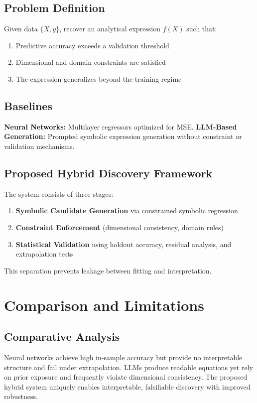 \documentclass[11pt]{article}
\begin{document}
\subsection{Problem Definition}
Given data $\{X, y\}$, recover an analytical expression $f(X)$ such that:
\begin{enumerate}
\item Predictive accuracy exceeds a validation threshold
\item Dimensional and domain constraints are satisfied
\item The expression generalizes beyond the training regime
\end{enumerate}

\subsection{Baselines}
\textbf{Neural Networks:} Multilayer regressors optimized for MSE.
\textbf{LLM-Based Generation:} Prompted symbolic expression generation without constraint or validation mechanisms.

\subsection{Proposed Hybrid Discovery Framework}
The system consists of three stages:
\begin{enumerate}
\item \textbf{Symbolic Candidate Generation} via constrained symbolic regression
\item \textbf{Constraint Enforcement} (dimensional consistency, domain rules)
\item \textbf{Statistical Validation} using holdout accuracy, residual analysis, and extrapolation tests
\end{enumerate}
This separation prevents leakage between fitting and interpretation.

\section{Comparison and Limitations}

\subsection{Comparative Analysis}
Neural networks achieve high in-sample accuracy but provide no interpretable structure and fail under extrapolation. LLMs produce readable equations yet rely on prior exposure and frequently violate dimensional consistency. The proposed hybrid system uniquely enables interpretable, falsifiable discovery with improved robustness.
\end{document}
